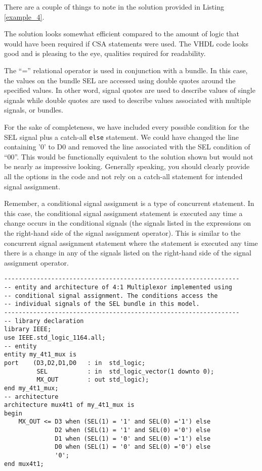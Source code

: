There are a couple of things to note in the solution provided in Listing \ref{example_4}.
\begin{my_list}
\item The solution looks somewhat efficient compared to the amount of logic that would have been required if CSA statements were used. The VHDL code looks good and is pleasing to the eye, qualities required for readability.
\item The ``='' relational operator is used in conjunction with a bundle. In this case, the values on the bundle SEL are accessed using double quotes around the specified values. In other word, signal quotes are used to describe values of single signals while double quotes are used to describe values associated with multiple signals, or bundles.
\item For the sake of completeness, we have included every possible condition for the SEL signal plus a catch-all \texttt{else} statement. We could have changed the line containing '0' to D0 and removed the line associated with the SEL condition of ``00''. This would be functionally equivalent to the solution shown but would not be nearly as impressive looking. Generally speaking, you should clearly provide all the options in the code and not rely on a catch-all statement for intended signal assignment.
\end{my_list}
Remember, a conditional signal assignment is a type of concurrent statement. In this case, the conditional signal assignment statement is executed any time a change occurs in the conditional signals (the signals listed in the expressions on the right-hand side of the signal assignment operator). This is similar to the concurrent signal assignment statement where the statement is executed any time there is a change in any of the signals listed on the right-hand side of the signal assignment operator.

\begin{lstlisting}[float, label=example_4_bis, caption=Alternative solution to Example 4 accessing individual signals.]
-----------------------------------------------------------------
-- entity and architecture of 4:1 Multiplexor implemented using
-- conditional signal assignment. The conditions access the
-- individual signals of the SEL bundle in this model.
-----------------------------------------------------------------
-- library declaration
library IEEE;
use IEEE.std_logic_1164.all;
-- entity
entity my_4t1_mux is
port	(D3,D2,D1,D0   : in  std_logic;
         SEL           : in  std_logic_vector(1 downto 0);
         MX_OUT        : out std_logic);
end my_4t1_mux;
-- architecture
architecture mux4t1 of my_4t1_mux is
begin
	MX_OUT <= D3 when (SEL(1) = '1' and SEL(0) ='1') else
	          D2 when (SEL(1) = '1' and SEL(0) ='0') else
	          D1 when (SEL(1) = '0' and SEL(0) ='1') else
	          D0 when (SEL(1) = '0' and SEL(0) ='0') else
	          '0';
end mux4t1;
\end{lstlisting}

